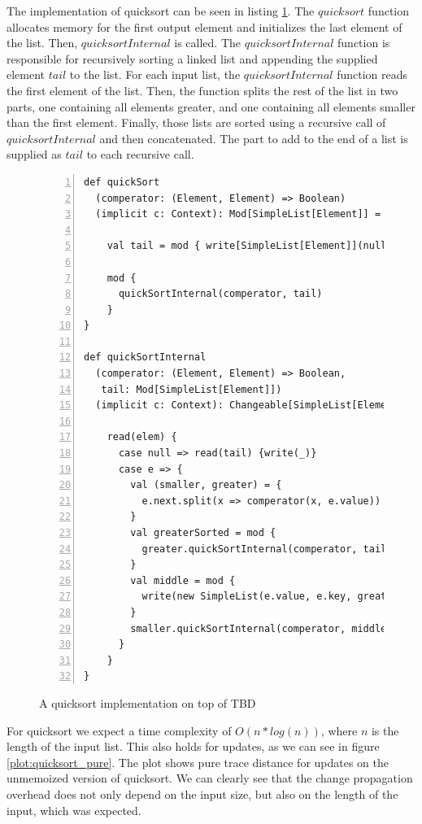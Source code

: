 The implementation of quicksort can be seen in listing \ref{code:quicksort}. The $quicksort$ function allocates memory for the first output element and initializes the last element of the list. Then, $quicksortInternal$ is called. The $quicksortInternal$ function is responsible for recursively sorting a linked list and appending the supplied element $tail$ to the list. For each input list, the $quicksortInternal$ function reads the first element of the list. Then, the function splits the rest of the list in two parts, one containing all elements greater, and one containing all elements smaller than the first element. Finally, those lists are sorted using a recursive call of $quicksortInternal$ and then concatenated. The part to add to the end of a list is supplied as $tail$ to each recursive call.

\begin{figure}
\begin{lstlisting}[frame=single,basicstyle=\ttfamily,numbers=left,mathescape=true]
def quickSort
  (comperator: (Element, Element) => Boolean)
  (implicit c: Context): Mod[SimpleList[Element]] = {

    val tail = mod { write[SimpleList[Element]](null) }

    mod {
      quickSortInternal(comperator, tail)
    }
}

def quickSortInternal
  (comperator: (Element, Element) => Boolean,
   tail: Mod[SimpleList[Element]])
  (implicit c: Context): Changeable[SimpleList[Element]] = {

    read(elem) {
      case null => read(tail) {write(_)}
      case e => {
        val (smaller, greater) = {
          e.next.split(x => comperator(x, e.value))
        }
        val greaterSorted = mod { 
          greater.quickSortInternal(comperator, tail) 
        }
        val middle = mod { 
          write(new SimpleList(e.value, e.key, greaterSorted)) 
        }
        smaller.quickSortInternal(comperator, middle)
      }
    }
}

\end{lstlisting}
\caption{A quicksort implementation on top of TBD}
\label{code:quicksort}
\end{figure}

For quicksort we expect a time complexity of $O(n * log(n))$, where $n$ is the length of the input list. This also holds for updates, as we can see in figure \ref{plot:quicksort_pure}. The plot shows pure trace distance for updates on the unmemoized version of quicksort. We can clearly see that the change propagation overhead does not only depend on the input size, but also on the length of the input, which was expected. 

